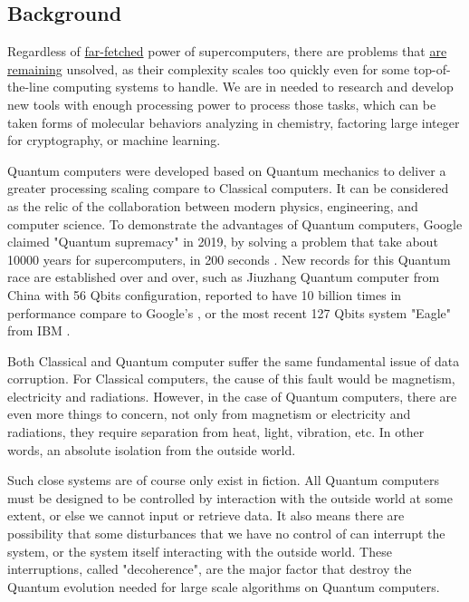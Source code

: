 \subsection{Background}

Regardless of \underline{far-fetched} power of supercomputers, there are problems that \underline{are remaining} unsolved, as their complexity scales too quickly even for some top-of-the-line computing systems to handle. 
We are in needed to research and develop new tools with enough processing power to process those tasks, which can be taken forms of molecular behaviors analyzing in chemistry, factoring large integer for cryptography, or machine learning.

Quantum computers were developed based on Quantum mechanics to deliver a greater processing scaling compare to Classical computers.
It can be considered as the relic of the collaboration between modern physics, engineering, and computer science.
To demonstrate the advantages of Quantum computers, Google claimed "Quantum supremacy" in 2019, by solving a problem that take about 10000 years for supercomputers, in 200 seconds \cite{hsuGoogleQuantumTech2019}.
New records for this Quantum race are established over and over, such as Jiuzhang Quantum computer from China with 56 Qbits configuration, reported to have 10 billion times in performance compare to Google's \cite{zhongQuantumComputationalAdvantage2020}, or the most recent 127 Qbits system "Eagle" from IBM \cite{chow2021ibm}.

Both Classical and Quantum computer suffer the same fundamental issue of data corruption.
For Classical computers, the cause of this fault would be magnetism, electricity and radiations.
However, in the case of Quantum computers, there are even more things to concern, not only from magnetism or electricity and radiations, they require separation from heat, light, vibration, etc. In other words, an absolute isolation from the outside world.

Such close systems are of course only exist in fiction. 
All Quantum computers must be designed to be controlled by interaction with the outside world at some extent, or else we cannot input or retrieve data.
It also means there are possibility that some disturbances that we have no control of can interrupt the system, or the system itself interacting with the outside world.
These interruptions, called "decoherence", are the major factor that destroy the Quantum evolution needed for large scale algorithms on Quantum computers.

